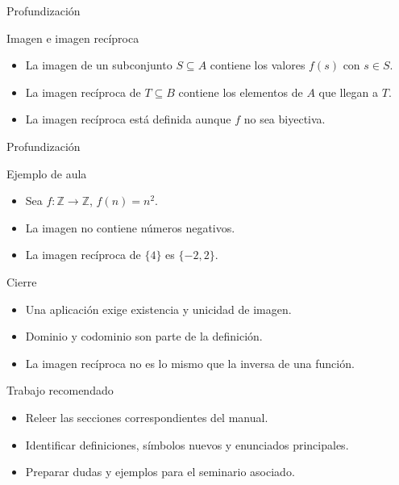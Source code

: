 \documentclass[aspectratio=169,11pt]{beamer}
\begin{document}
\begin{frame}{Profundización}
\begin{block}{Imagen e imagen recíproca}
\begin{itemize}
  \item La imagen de un subconjunto \(S\subseteq A\) contiene los valores \(f(s)\) con \(s\in S\).
  \item La imagen recíproca de \(T\subseteq B\) contiene los elementos de \(A\) que llegan a \(T\).
  \item La imagen recíproca está definida aunque \(f\) no sea biyectiva.
\end{itemize}
\end{block}
\end{frame}

\begin{frame}{Profundización}
\begin{block}{Ejemplo de aula}
\begin{itemize}
  \item Sea \(f:\mathbb{Z}\to\mathbb{Z}\), \(f(n)=n^2\).
  \item La imagen no contiene números negativos.
  \item La imagen recíproca de \(\{4\}\) es \(\{-2,2\}\).
\end{itemize}
\end{block}
\end{frame}

\begin{frame}{Cierre}
\begin{itemize}
  \item Una aplicación exige existencia y unicidad de imagen.
  \item Dominio y codominio son parte de la definición.
  \item La imagen recíproca no es lo mismo que la inversa de una función.
\end{itemize}
\end{frame}

\begin{frame}{Trabajo recomendado}
\begin{itemize}
  \item Releer las secciones correspondientes del manual.
  \item Identificar definiciones, símbolos nuevos y enunciados principales.
  \item Preparar dudas y ejemplos para el seminario asociado.
\end{itemize}
\end{frame}
\end{document}
